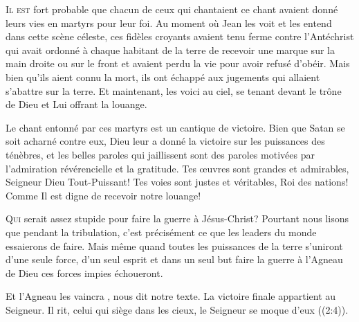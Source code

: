 \lettrine{I}{l est} fort probable que chacun de ceux qui chantaient
 ce chant avaient donné leurs vies en martyrs pour leur foi.
 Au moment où Jean les voit et les entend dans cette scène céleste,
 ces fidèles croyants avaient tenu ferme contre l'Antéchrist
 \ocadr qui avait ordonné à chaque habitant de la terre de recevoir
 une marque sur la main droite ou sur le front \fcadr{}
 et avaient perdu la vie pour avoir refusé d'obéir.
 Mais bien qu'ils aient connu la mort, ils ont échappé aux jugements
 qui allaient s'abattre sur la terre. Et maintenant, les voici au ciel,
 se tenant devant le trône de Dieu et Lui offrant la louange.

Le chant entonné par ces martyrs est un cantique de victoire.
 Bien que Satan se soit acharné contre eux, Dieu leur a donné la victoire
 sur les puissances des ténèbres, et les belles paroles qui jaillissent
 sont des paroles motivées par l'admiration révérencielle et la gratitude.
 \og Tes \oe{}uvres sont grandes et admirables, Seigneur Dieu Tout-Puissant!
 Tes voies sont justes et véritables, Roi des nations! \fg{}
 Comme Il est digne de recevoir notre louange!


\dvrule






\lettrine{Q}{ui} serait assez stupide pour faire la guerre à Jésus-Christ?
 Pourtant nous lisons que pendant la tribulation,
 c'est précisément ce que les leaders du monde essaierons de faire.
 Mais même quand toutes les puissances de la terre s'uniront d'une seule force,
 d'un seul esprit et dans un seul but
 \ocadr faire la guerre à l'Agneau de Dieu \fcadr{}
 ces forces impies échoueront.

\og Et l'Agneau les vaincra \fg{}, 
 nous dit notre texte. La victoire finale appartient au Seigneur.
 \og Il rit, celui qui siège dans les cieux, le Seigneur se moque d'eux \fg{}
 ((2:4)).

